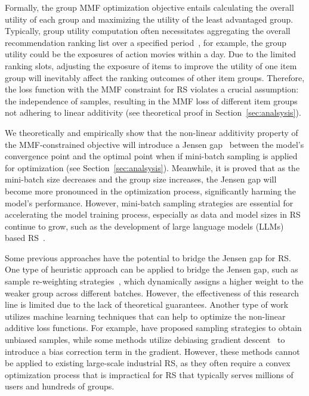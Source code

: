 Formally, the group MMF optimization objective entails calculating the overall utility of each group and maximizing the utility of the least advantaged group. Typically, group utility computation often necessitates aggregating the overall recommendation ranking list over a specified period~\citep{xu2023p, nips21welf, xu2024fairsync}, for example, the group utility could be the exposures of action movies within a day. 
Due to the limited ranking slots, adjusting the exposure of items to improve the utility of one item group will inevitably affect the ranking outcomes of other item groups. 
Therefore, the loss function with the MMF constraint for RS violates a crucial assumption: the independence of samples, resulting in the MMF loss of different item groups not adhering to linear additivity (see theoretical proof in Section~\ref{sec:analsysis}). 



We theoretically and empirically show that the non-linear additivity property of the MMF-constrained objective will introduce a Jensen gap~\citep{gao2017bounds, ullah2021determination} between the model's convergence point and the optimal point when if mini-batch sampling is applied for optimization (see Section~\ref{sec:analsysis}). 
Meanwhile, it is proved that as the mini-batch size decreases and the group size increases, the Jensen gap will become more pronounced in the optimization process, significantly harming the model's performance. 
However, mini-batch sampling strategies are essential for accelerating the model training process, especially as data and model sizes in RS continue to grow, such as the development of large language models (LLMs) based RS~\citep{bao2023bi, lin2024bridging, lin2024data}.






Some previous approaches have the potential to bridge the Jensen gap for RS. 
One type of heuristic approach can be applied to bridge the Jensen gap, such as sample re-weighting strategies~\citep{chen2023fairly, wen2022distributionally}, which dynamically assigns a higher weight to the weaker group across different batches.
However, the effectiveness of this research line is limited due to the lack of theoretical guarantees. 
Another type of work utilizes machine learning techniques that can help to optimize the non-linear additive loss functions. 
For example, \cite{abernethy2022active, cousins2022uncertainty} have proposed sampling strategies to obtain unbiased samples, while some methods utilize debiasing gradient descent~\citep{demidovich2023guide, agarwal2018reductions} to introduce a bias correction term in the gradient. However, these methods cannot be applied to existing large-scale industrial RS, as they often require a convex optimization process that is impractical for RS that typically serves millions of users and hundreds of groups.


